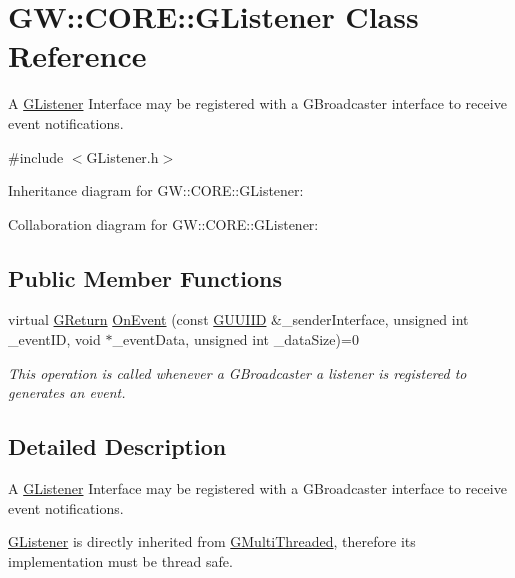 \hypertarget{classGW_1_1CORE_1_1GListener}{}\section{GW\+:\+:C\+O\+RE\+:\+:G\+Listener Class Reference}
\label{classGW_1_1CORE_1_1GListener}


A \hyperlink{classGW_1_1CORE_1_1GListener}{G\+Listener} Interface may be registered with a G\+Broadcaster interface to receive event notifications.  




{\ttfamily \#include $<$G\+Listener.\+h$>$}



Inheritance diagram for GW\+:\+:C\+O\+RE\+:\+:G\+Listener\+:


Collaboration diagram for GW\+:\+:C\+O\+RE\+:\+:G\+Listener\+:
\subsection*{Public Member Functions}
\begin{DoxyCompactItemize}
\item 
virtual \hyperlink{namespaceGW_a67a839e3df7ea8a5c5686613a7a3de21}{G\+Return} \hyperlink{classGW_1_1CORE_1_1GListener_a5c1d1fac213b7a1cc15d384aa0c33105}{On\+Event} (const \hyperlink{structGW_1_1GUUIID}{G\+U\+U\+I\+ID} \&\+\_\+sender\+Interface, unsigned int \+\_\+event\+ID, void $\ast$\+\_\+event\+Data, unsigned int \+\_\+data\+Size)=0
\begin{DoxyCompactList}\small\item\em This operation is called whenever a G\+Broadcaster a listener is registered to generates an event. \end{DoxyCompactList}\end{DoxyCompactItemize}


\subsection{Detailed Description}
A \hyperlink{classGW_1_1CORE_1_1GListener}{G\+Listener} Interface may be registered with a G\+Broadcaster interface to receive event notifications. 

\hyperlink{classGW_1_1CORE_1_1GListener}{G\+Listener} is directly inherited from \hyperlink{classGW_1_1CORE_1_1GMultiThreaded}{G\+Multi\+Threaded}, therefore its implementation must be thread safe. 

